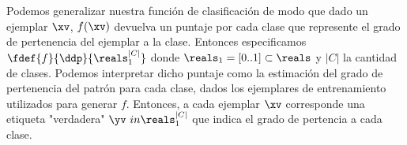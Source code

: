 

Podemos generalizar nuestra función de clasificación de modo que dado un ejemplar $\xv$, $f(\xv)$ devuelva un puntaje por cada clase que represente el grado de pertenencia del ejemplar a la clase. Entonces especificamos $\fdef{f}{\ddp}{\reals_1^{|C|}} $ donde $\reals_1=[0..1] \subset \reals$ y $|C|$ la cantidad de clases. Podemos interpretar dicho puntaje como la estimación del grado de pertenencia del patrón para cada clase, dados los ejemplares de entrenamiento utilizados para generar $f$. Entonces, a cada ejemplar $\xv$ corresponde una etiqueta "verdadera" $\yv \ in \reals_1^{|C|}$ que indica el grado de pertencia a cada clase.
